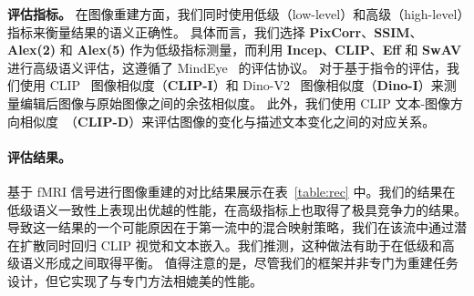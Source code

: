 \textbf{评估指标。} 在图像重建方面，我们同时使用低级（low-level）和高级（high-level）指标来衡量结果的语义正确性。
具体而言，我们选择 \textbf{PixCorr}、\textbf{SSIM}、\textbf{Alex(2)} 和 \textbf{Alex(5)} 作为低级指标测量，而利用 \textbf{Incep}、\textbf{CLIP}、\textbf{Eff} 和 \textbf{SwAV} 进行高级语义评估，这遵循了 MindEye~\cite{scotti2023reconstructing} 的评估协议。
对于基于指令的评估，我们使用 CLIP~\cite{radford2021learning} 图像相似度（\textbf{CLIP-I}）和 Dino-V2~\cite{oquab2023dinov2} 图像相似度（\textbf{Dino-I}）来测量编辑后图像与原始图像之间的余弦相似度。
此外，我们使用 CLIP 文本-图像方向相似度~\cite{gal2022stylegan}（\textbf{CLIP-D}）来评估图像的变化与描述文本变化之间的对应关系。

\paragraph{评估结果。} 基于 fMRI 信号进行图像重建的对比结果展示在表~\ref{table:rec} 中。我们的结果在低级语义一致性上表现出优越的性能，在高级指标上也取得了极具竞争力的结果。
导致这一结果的一个可能原因在于第一流中的混合映射策略，我们在该流中通过潜在扩散同时回归 CLIP 视觉和文本嵌入。我们推测，这种做法有助于在低级和高级语义形成之间取得平衡。
值得注意的是，尽管我们的框架并非专门为重建任务设计，但它实现了与专门方法相媲美的性能。

